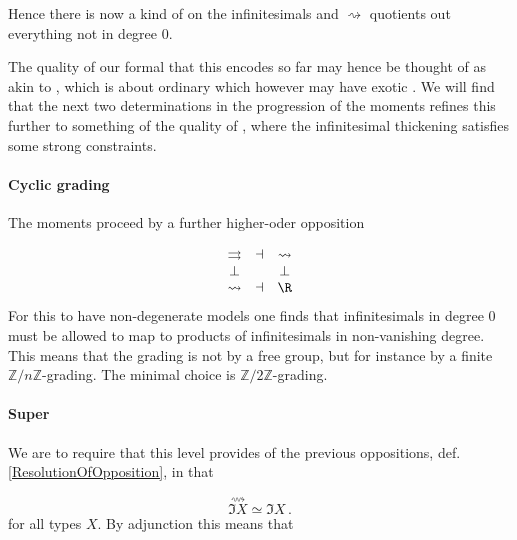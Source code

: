 \documentclass[12pt,titlepage]{article}
\newcommand{\itexarray}[1]{\begin{matrix}#1\end{matrix}}
\theoremstyle{plain}
\theoremstyle{definition}
\theoremstyle{remark}
\begin{document}
Hence there is now a kind of  on the infinitesimals and $\rightsquigarrow$ quotients out everything not in degree 0.

The  quality of our formal  that this encodes so far may hence be thought of as akin to , which is about ordinary  which however may have exotic  . We will find that the next two determinations in the progression of the moments refines this further to something of the quality of , where the infinitesimal thickening satisfies some strong constraints.

\hypertarget{cyclic_grading}{}\paragraph*{{Cyclic grading}}\label{cyclic_grading}

The moments proceed by a further higher-oder opposition

\begin{displaymath}
\itexarray{
    \rightrightarrows &\dashv& \rightsquigarrow
    \\
    \bot && \bot
    \\
    \rightsquigarrow &\dashv& \R
  }
\end{displaymath}
For this to have non-degenerate models one finds that infinitesimals in degree 0 must be allowed to map to products of infinitesimals in non-vanishing degree. This means that the grading is not by a free group, but for instance by a finite  $\mathbb{Z}/n\mathbb{Z}$-grading. The minimal choice is $\mathbb{Z}/2\mathbb{Z}$-grading.

\hypertarget{FormalizationSuperGrading}{}\paragraph*{{Super}}\label{FormalizationSuperGrading}

We are to require that this level provides  of the previous oppositions, def. \ref{ResolutionOfOpposition}, in that

\begin{displaymath}
\stackrel{\rightsquigarrow}{\Im X} \simeq \Im X
  \,.
\end{displaymath}
for all types $X$. By adjunction this means that
\end{document}
